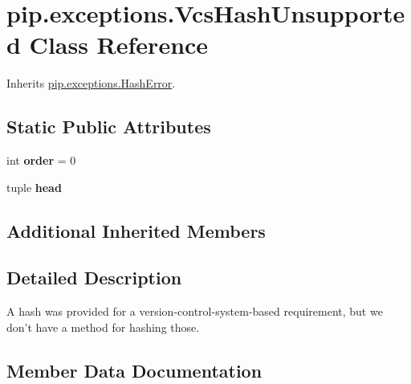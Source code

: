\hypertarget{classpip_1_1exceptions_1_1_vcs_hash_unsupported}{}\section{pip.\+exceptions.\+Vcs\+Hash\+Unsupported Class Reference}
\label{classpip_1_1exceptions_1_1_vcs_hash_unsupported}


Inherits \hyperlink{classpip_1_1exceptions_1_1_hash_error}{pip.\+exceptions.\+Hash\+Error}.

\subsection*{Static Public Attributes}
\begin{DoxyCompactItemize}
\item 
\mbox{\label{classpip_1_1exceptions_1_1_vcs_hash_unsupported_aec630f66fd0ad703e0077576132023c3}} 
int {\bfseries order} = 0
\item 
tuple {\bfseries head}
\end{DoxyCompactItemize}
\subsection*{Additional Inherited Members}


\subsection{Detailed Description}
\begin{DoxyVerb}A hash was provided for a version-control-system-based requirement, but
we don't have a method for hashing those.\end{DoxyVerb}
 

\subsection{Member Data Documentation}
\mbox{\label{classpip_1_1exceptions_1_1_vcs_hash_unsupported_a1037dcbf87bd7801756e16ca9983afb6}} 
